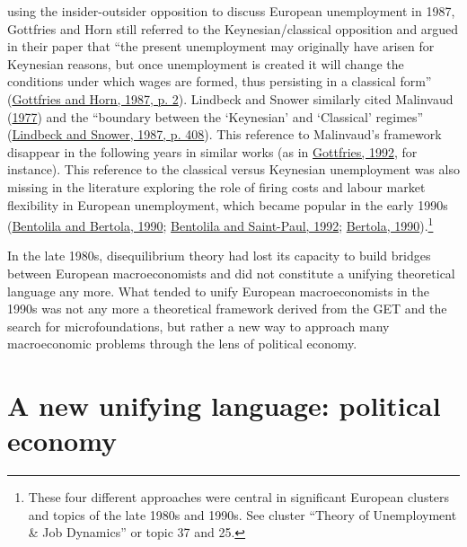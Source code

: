 \documentclass[
  12pt,
  onecolumn]{article}
\begin{document}
using the insider-outsider opposition to discuss European unemployment
in 1987, Gottfries and Horn still referred to the Keynesian/classical
opposition and argued in their paper that ``the present unemployment may
originally have arisen for Keynesian reasons, but once unemployment is
created it will change the conditions under which wages are formed, thus
persisting in a classical form''
(\protect\hyperlink{ref-gottfries1987}{Gottfries and Horn, 1987, p. 2}).
Lindbeck and Snower similarly cited Malinvaud
(\protect\hyperlink{ref-malinvaud1977}{1977}) and the ``boundary between
the `Keynesian' and `Classical' regimes''
(\protect\hyperlink{ref-lindbeck1987a}{Lindbeck and Snower, 1987, p.
408}). This reference to Malinvaud's framework disappear in the
following years in similar works (as in
\protect\hyperlink{ref-gottfries1992}{Gottfries, 1992}, for instance).
This reference to the classical versus Keynesian unemployment was also
missing in the literature exploring the role of firing costs and labour
market flexibility in European unemployment, which became popular in the
early 1990s (\protect\hyperlink{ref-bentolila1990}{Bentolila and
Bertola, 1990}; \protect\hyperlink{ref-bentolila1992a}{Bentolila and
Saint-Paul, 1992}; \protect\hyperlink{ref-bertola1990a}{Bertola,
1990}).\footnote{These four different approaches were central in
  significant European clusters and topics of the late 1980s and 1990s.
  See cluster ``Theory of Unemployment \& Job Dynamics'' or topic 37 and
  25.}

In the late 1980s, disequilibrium theory had lost its capacity to build
bridges between European macroeconomists and did not constitute a
unifying theoretical language any more. What tended to unify European
macroeconomists in the 1990s was not any more a theoretical framework
derived from the GET and the search for microfoundations, but rather a
new way to approach many macroeconomic problems through the lens of
political economy.

\hypertarget{political-economics}{%
\section{A new unifying language: political
economy}\label{political-economics}}
\end{document}
